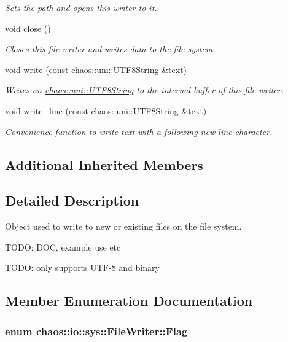 \begin{DoxyCompactItemize}
\begin{DoxyCompactList}\small\item\em Sets the path and opens this writer to it. \end{DoxyCompactList}\item 
void \hyperlink{classchaos_1_1io_1_1sys_1_1_file_writer_ad5b7240d9d4856d6e2b8ddf99a11bced}{close} ()
\begin{DoxyCompactList}\small\item\em Closes this file writer and writes data to the file system. \end{DoxyCompactList}\item 
void \hyperlink{classchaos_1_1io_1_1sys_1_1_file_writer_adb940c8094f94604f78879b3901584d4}{write} (const \hyperlink{classchaos_1_1uni_1_1_u_t_f8_string}{chaos\-::uni\-::\-U\-T\-F8\-String} \&text)
\begin{DoxyCompactList}\small\item\em Writes an \hyperlink{classchaos_1_1uni_1_1_u_t_f8_string}{chaos\-::uni\-::\-U\-T\-F8\-String} to the internal buffer of this file writer. \end{DoxyCompactList}\item 
void \hyperlink{classchaos_1_1io_1_1sys_1_1_file_writer_a76915355409987ffb0a8376e76fda7ca}{write\-\_\-line} (const \hyperlink{classchaos_1_1uni_1_1_u_t_f8_string}{chaos\-::uni\-::\-U\-T\-F8\-String} \&text)
\begin{DoxyCompactList}\small\item\em Convenience function to write text with a following new line character. \end{DoxyCompactList}\end{DoxyCompactItemize}
\subsection*{Additional Inherited Members}


\subsection{Detailed Description}
Object used to write to new or existing files on the file system. 

T\-O\-D\-O\-: D\-O\-C, example use etc

T\-O\-D\-O\-: only supports U\-T\-F-\/8 and binary 

\subsection{Member Enumeration Documentation}
\hypertarget{classchaos_1_1io_1_1sys_1_1_file_writer_aafcaef6dd3171373d8dfadadcc3c1b0b}{
\subsubsection[{Flag}]{\setlength{\rightskip}{0pt plus 5cm}enum {\bf chaos\-::io\-::sys\-::\-File\-Writer\-::\-Flag}}}\label{classchaos_1_1io_1_1sys_1_1_file_writer_aafcaef6dd3171373d8dfadadcc3c1b0b}


